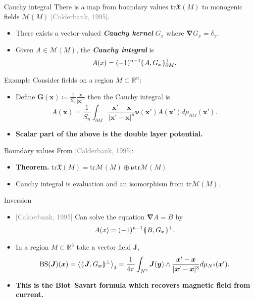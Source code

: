\documentclass[aspectratio=169,handout]{beamer}
\newcommand\boldgreen[1]{\textcolor{lighter_csu_green}{\emph{\textbf{#1}}}}
\newcommand\boldgold[1]{\textcolor{csu_gold}{\textbf{#1}}}
\newcommand\grey[1]{\textcolor{gray}{#1}}
\newcommand{\directedintproduct}[2]{\llparenthesis \hspace*{.5mm}#1 , #2\hspace*{.5mm} \rrparenthesis}
\newcommand{\trace}{\mathrm{tr}}
\newcommand{\R}{\mathbb{R}}
\newcommand{\grad}{\boldsymbol{\nabla}}
\newcommand{\monogenics}{\mathcal{M}}
\newcommand{\blade}[1]{\boldsymbol{#1}}
\newcommand{\boundary}{{\partial M}}
\newcommand{\normal}{\blade{\nu}}
\DeclarePairedDelimiter\angles{\langle}{\rangle}
\newcommand{\proj}[2]{\angles*{#2}_{#1}}
\newcommand{\smoothfields}{\mathfrak{X}}
\begin{document}
\begin{frame}{Cauchy integral}
\vfill
There is a map from boundary values $\trace \smoothfields(M)$ to monogenic fields $\monogenics(M)$ \grey{[Calderbank, 1995]}.
\begin{itemize}
\pause
\item There exists a vector-valued \boldgreen{Cauchy kernel} $G_x$ where $\grad G_x = \delta_x$.
\pause
\item Given $A\in \monogenics(M)$, the \boldgreen{Cauchy integral} is
\[
A(x)=(-1)^{n-1}\directedintproduct{A}{G_x}_{\boundary}^\perp.
\]
\end{itemize}
\vfill
\end{frame}

\begin{frame}{Example}
\vfill
Consider fields on a region $M\subset \R^n$:
\begin{itemize}
\pause
\item Define $\blade{G}(\blade{x}) \coloneqq \frac{1}{S_n}\frac{\blade{x}}{|\blade{x}|^n}$ then the Cauchy integral is
\[
A(\blade{x}) = \frac{1}{S_n} \int_\boundary \frac{\blade{x}' - \blade{x}}{|\blade{x}' - \blade{x}|^n}\normal(\blade{x}') A(\blade{x}') d \mu_{\boundary}(\blade{x}').
\]
\pause
\item \boldgold{Scalar part of the above is the double layer potential.}
\end{itemize}
\vfill
\end{frame}

\begin{frame}{Boundary values}
\vfill
From \grey{[Calderbank, 1995]}:
\begin{itemize}
\pause
\item \boldgold{Theorem.} $\trace \smoothfields(M) = \trace \monogenics(M) \oplus \normal \trace \monogenics(M)$
\pause
\item Cauchy integral is evaluation and an isomorphism from $\trace \monogenics(M)$.
\vfill
\end{itemize}
\end{frame}


\begin{frame}{Inversion}
\vfill
\begin{itemize}
  \pause
  \item \grey{[Calderbank, 1995]} Can solve the equation $\grad A=B$ by
\[
A(x) = (-1)^{n-1}\directedintproduct{B}{G_x}^\perp.
\]
  \pause
  \item In a region $M\subset \R^3$ take a vector field $\blade{J}$,
  \[
  \operatorname{BS}(\blade{J})(\blade{x}) = \proj{2}{\directedintproduct{\blade{J}}{G_{\blade{x}}}^\perp} = \frac{1}{4\pi} \int_{N^3} \blade{J}(\blade{y}) \wedge \frac{\blade{x}'-\blade{x}}{|\blade{x}'-\blade{x}|^{3}} d\mu_{N^3}(\blade{x}').
  \]
  \pause
  \item \boldgold{This is the Biot--Savart formula which recovers magnetic field from current.}
  \end{itemize}
\vfill
\end{frame}
\end{document}
